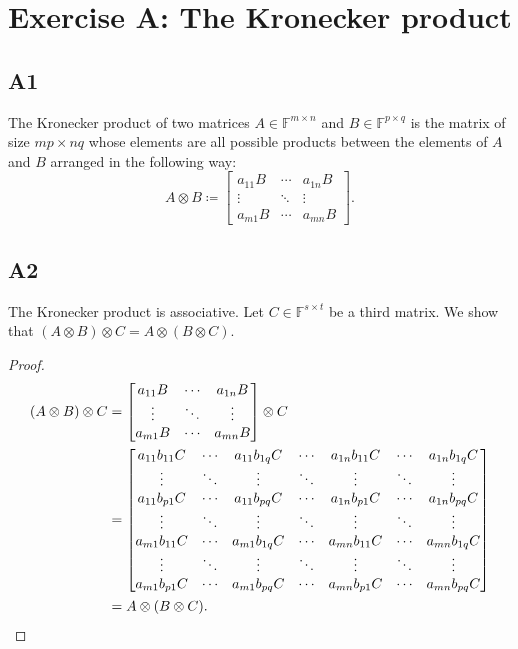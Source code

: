 \documentclass[11pt]{article}
\newcommand{\field}{\mathbb{F}} %
\newcommand{\kp}{\otimes} %
\begin{document}
\section*{Exercise A: The Kronecker product}
\subsection*{A1}
The Kronecker product of two matrices \(A \in \field^{m \times n}\) and \(B \in \field^{p \times q}\) is the matrix of size \(mp \times nq\) whose elements are all possible products between the elements of \(A\) and \(B\) arranged in the following way:
\[
A \kp B \coloneqq \begin{bmatrix}
a_{11} B & \cdots & a_{1n}B \\
\vdots & \ddots & \vdots \\
a_{m1} B & \cdots & a_{mn} B
\end{bmatrix}.
\]

\subsection*{A2}
The Kronecker product is associative.
Let \(C \in \field^{s \times t}\) be a third matrix.
We show that \((A \kp B) \kp C = A \kp (B \kp C)\).
\begin{proof}
\begin{align*}
(A \kp B) \kp C &= \begin{bmatrix}
a_{11} B & \cdots & a_{1n}B \\
\vdots & \ddots & \vdots \\
a_{m1} B & \cdots & a_{mn} B
\end{bmatrix} \kp C \\
&= \begin{bmatrix}
a_{11} b_{11} C & \cdots & a_{11} b_{1q} C & \cdots & a_{1n} b_{11} C & \cdots & a_{1n} b_{1q} C \\
\vdots & \ddots & \vdots & \ddots & \vdots & \ddots & \vdots \\
a_{11} b_{p1} C & \cdots & a_{11} b_{pq} C & \cdots & a_{1n} b_{p1} C & \cdots & a_{1n} b_{pq} C \\
\vdots & \ddots & \vdots & \ddots & \vdots & \ddots & \vdots \\
a_{m1} b_{11} C & \cdots & a_{m1} b_{1q} C & \cdots & a_{mn} b_{11} C & \cdots & a_{mn} b_{1q} C \\
\vdots & \ddots & \vdots & \ddots & \vdots & \ddots & \vdots \\
a_{m1} b_{p1} C & \cdots & a_{m1} b_{pq} C & \cdots & a_{mn} b_{p1} C & \cdots & a_{mn} b_{pq} C
\end{bmatrix}\\
&= A \kp (B \kp C).\qedhere
\end{align*}
\end{proof}
\end{document}

